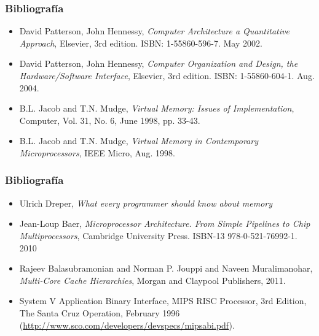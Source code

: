 \documentclass{beamer}
\begin{document}
\begin{frame}
 \frametitle{Bibliografía}
 \begin{itemize}

\item David Patterson, John Hennessy, \textit{Computer Architecture a Quantitative Approach}, Elsevier, 3rd edition. ISBN: 1-55860-596-7. May 2002.  
  
\item David Patterson, John Hennessy, \textit{Computer Organization and Design, the Hardware/Software Interface},  Elsevier, 3rd edition. ISBN: 1-55860-604-1. Aug. 2004. 
    
\item B.L. Jacob and T.N. Mudge, \textit{Virtual Memory: Issues of Implementation}, Computer, Vol. 31, No. 6, June 1998, pp. 33-43.

\item B.L. Jacob and T.N. Mudge, \textit{Virtual Memory in Contemporary Microprocessors}, IEEE Micro, Aug. 1998.
\end{itemize}

\end{frame}
    
\begin{frame}
 \frametitle{Bibliografía}
 \begin{itemize}

 \item Ulrich Dreper, \textit{What every programmer should know about memory
 }
\item Jean-Loup Baer, \textit{Microprocessor Architecture. From Simple Pipelines to Chip Multiprocessors}, Cambridge University Press. ISBN-13 978-0-521-76992-1. 2010

\item Rajeev Balasubramonian and Norman P. Jouppi and Naveen Muralimanohar, \textit{Multi-Core Cache Hierarchies}, Morgan and Claypool Publishers, 2011.

\item System V Application Binary Interface, MIPS RISC Processor, 3rd Edition, The Santa Cruz Operation, February 1996 (\url{http://www.sco.com/developers/devspecs/mipsabi.pdf}).
\end{itemize}

 \end{frame}
\end{document}
